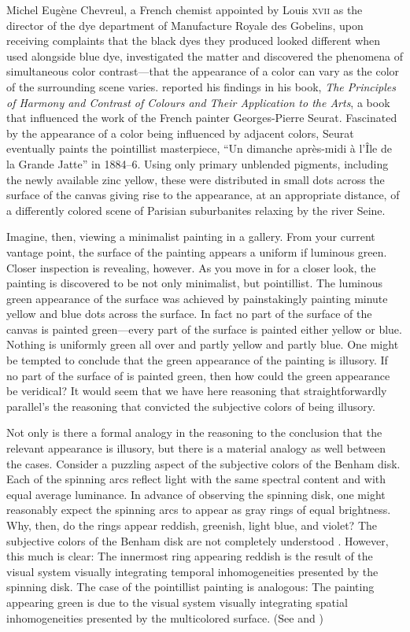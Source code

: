\documentclass[12pt]{article}
\begin{document}
Michel Eugène Chevreul, a French chemist appointed by Louis \textsc{xvii} as the director of the dye department of Manufacture Royale des Gobelins, upon receiving complaints that the black dyes they produced looked different when used alongside blue dye, investigated the matter and discovered the phenomena of simultaneous color contrast---that the appearance of a color can vary as the color of the surrounding scene varies. \citet{Chevreul:1855kx} reported his findings in his book, \emph{The Principles of Harmony and Contrast of Colours and Their Application to the Arts}, a book that influenced the work of the French painter Georges-Pierre Seurat. Fascinated by the appearance of a color being influenced by adjacent colors, Seurat eventually paints the pointillist masterpiece, “Un dimanche après-midi à l'Île de la Grande Jatte” in 1884--6. Using only primary unblended pigments, including the newly available zinc yellow, these were distributed in small dots across the surface of the canvas giving rise to the appearance, at an appropriate distance, of a differently colored scene of Parisian suburbanites relaxing by the river Seine.

Imagine, then, viewing a minimalist painting in a gallery. From your current vantage point, the surface of the painting appears a uniform if luminous green. Closer inspection is revealing, however. As you move in for a closer look, the painting is discovered to be not only minimalist, but pointillist. The luminous green appearance of the surface was achieved by painstakingly painting minute yellow and blue dots across the surface. In fact no part of the surface of the canvas is painted green---every part of the surface is painted either yellow or blue. Nothing is uniformly green all over and partly yellow and partly blue. One might be tempted to conclude that the green appearance of the painting is illusory. If no part of the surface of is painted green, then how could the green appearance be veridical? It would seem that we have here reasoning that straightforwardly parallel's the reasoning that convicted the subjective colors of being illusory.

Not only is there a formal analogy in the reasoning to the conclusion that the relevant appearance is illusory, but there is a material analogy as well between the cases. Consider a puzzling aspect of the subjective colors of the Benham disk. Each of the spinning arcs reflect light with the same spectral content and with equal average luminance. In advance of observing the spinning disk, one might reasonably expect the spinning arcs to appear as gray rings of equal brightness. Why, then, do the rings appear reddish, greenish, light blue, and violet? The subjective colors of the Benham disk are not completely understood \citep[for a review of some of the color science see][]{Campenhausen:1995yq}. However, this much is clear: The innermost ring appearing reddish is the result of the visual system visually integrating temporal inhomogeneities presented by the spinning disk. The case of the pointillist painting is analogous: The painting appearing green is due to the visual system visually integrating spatial inhomogeneities presented by the multicolored surface. (See \citealt[71--72]{Hardin:1993kn} and \citealt[156--158]{Johnston:1992ck})
\end{document}
